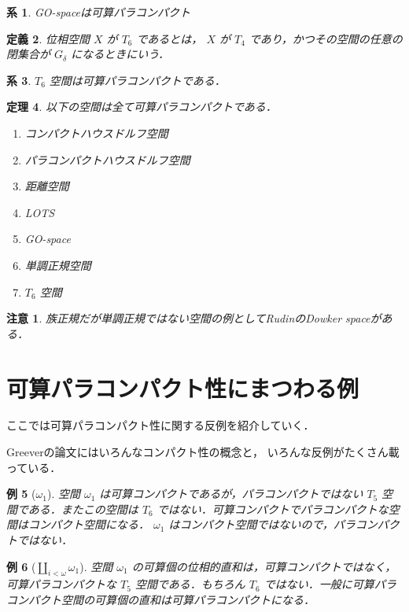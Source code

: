 \documentclass[leqno, 12pt]{ltjsarticle}
\newtheorem{thm}{定理}
\newtheorem{cor}[thm]{系}
\newtheorem{df}[thm]{定義}
\newtheorem{exam}[thm]{例}
\newtheorem*{rmk}{注意}
\newcommand{\omegaone}{\omega_{1}}
\begin{document}
\begin{cor}
GO-spaceは可算パラコンパクト
\end{cor}

\begin{df}
位相空間
$X$
が
$T_{6}$
であるとは，
$X$
が
$T_{4}$
であり，かつその空間の任意の閉集合が
$G_{\delta}$
になるときにいう．
\end{df}


\begin{cor}
$T_{6}$
空間は可算パラコンパクトである．
\end{cor}


\begin{thm}
以下の空間は全て可算パラコンパクトである．
\begin{enumerate}[label=\textup{(\arabic*)}]
\item コンパクトハウスドルフ空間
\item パラコンパクトハウスドルフ空間
\item 距離空間
\item LOTS
\item GO-space
\item 単調正規空間
\item
$T_{6}$
空間
\end{enumerate}
\end{thm}

\begin{rmk}
族正規だが単調正規ではない空間の例としてRudinのDowker spaceがある．
\end{rmk}



\section{可算パラコンパクト性にまつわる例}
ここでは可算パラコンパクト性に関する反例を紹介していく．

Greeverの論文\cite{Greever}にはいろんなコンパクト性の概念と，
いろんな反例がたくさん載っている．
\begin{exam}[$\omegaone$]
空間
$\omegaone$
は可算コンパクトであるが，パラコンパクトではない
$T_{5}$
空間である．またこの空間は
$T_{6}$
ではない．可算コンパクトでパラコンパクトな空間はコンパクト空間になる．
$\omegaone$
はコンパクト空間ではないので，パラコンパクトではない．
\end{exam}

\begin{exam}[$\coprod_{i<\omega}\omegaone$]
空間
$\omegaone$
の可算個の位相的直和は，可算コンパクトではなく，可算パラコンパクトな
$T_{5}$
空間である．もちろん
$T_{6}$
ではない．一般に可算パラコンパクト空間の可算個の直和は可算パラコンパクトになる．
\end{exam}
\end{document}
